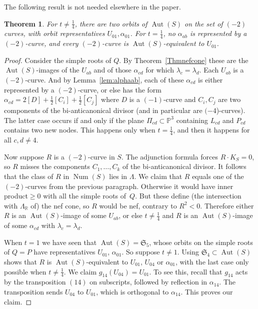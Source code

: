 \documentclass[11pt]{article}
\newtheorem{theo}{Theorem}[section]
\theoremstyle{definition}
\numberwithin{equation}{section}
\numberwithin{figure}{section}
\numberwithin{table}{section}
\newcommand*\sset{\subset}
\newcommand{\bbR}{{\mathbb{R}}}
\newcommand{\bbP}{{\mathbb{P}}}
\DeclareMathOperator{\Aut}{Aut}
\DeclareMathOperator{\Num}{Num}
\newcommand{\frakS}{\mathfrak{S}}
\begin{document}
The following result is not needed elsewhere in the paper.

\begin{theo}\label{ThmOrbitsOnCurves}
For $t\neq\frac14$, there are two orbits of $\Aut(S)$ on the set of $(-2)$ curves, with orbit representatives $U_{01},\alpha_{01}$. For $t=\frac14$, no $\alpha_{ab}$ is represented by a $(-2)$-curve, and every $(-2)$-curve is $\Aut(S)$-equivalent to $U_{01}$.
\end{theo}

\begin{proof}
Consider the simple roots of $Q$. By Theorem~\ref{Thmnefcone} these are the $\Aut(S)$-images of the $U_{ab}$ and of those $\alpha_{cd}$ for which $\lambda_c=\lambda_d$. Each $U_{ab}$ is a $(-2)$-curve. And by Lemma~\ref{lem:alphaab}, each of these $\alpha_{cd}$ is either represented by a $(-2)$-curve, or else has the form $\alpha_{cd}=2[D]+\frac12[C_i]+\frac12[C_j]$ where $D$ is a $(-1)$-curve and $C_i,C_j$ are two components of the bi-anticanonical divisor (and in particular are $(-4$)-curves). The latter case occurs if and only if the plane $\Pi_{cd}\sset\bbP^3$ containing $L_{cd}$ and $P_{cd}$ contains two new nodes. This happens only when $t=\frac14$, and then it happens for all $c,d\neq4$.

Now suppose $R$ is a $(-2)$-curve in $S$. The adjunction formula forces $R\cdot K_S=0$, so $R$ misses the components $C_1,\dots,C_k$ of the bi-anticanonical divisor. It follows that the class of $R$ in $\Num(S)$ lies in $\Lambda$. We claim that $R$ equals one of the $(-2)$-curves from the previous paragraph. Otherwise it would have inner product${ }\geq0$ with all the simple roots of~$Q$. But these define (the intersection with $\Lambda_\bbR$ of) the nef cone, so $R$ would be nef, contrary to $R^2<0$. Therefore either $R$ is an $\Aut(S)$-image of some $U_{ab}$, or else $t\neq\frac14$ and $R$ is an $\Aut(S)$-image of some $\alpha_{cd}$ with $\lambda_c=\lambda_d$.

When $t=1$ we have seen that $\Aut(S)=\frakS_5$, whose orbits on the simple roots of $Q=P$ have representatives $U_{01}$, $\alpha_{01}$. So suppose $t\neq1$. Using $\frakS_4\sset\Aut(S)$ shows that $R$ is $\Aut(S)$-equivalent to $U_{01}$, $U_{04}$ or $\alpha_{01}$, with the last case only possible when $t\neq\frac14$. We claim $g_{14}(U_{04})=U_{01}$. To see this, recall that $g_{14}$ acts by the transposition $(14)$ on subscripts, followed by reflection in $\alpha_{14}$. The transposition sends $U_{04}$ to $U_{01}$, which is orthogonal to $\alpha_{14}$. This proves our claim.


\end{proof}
\end{document}
